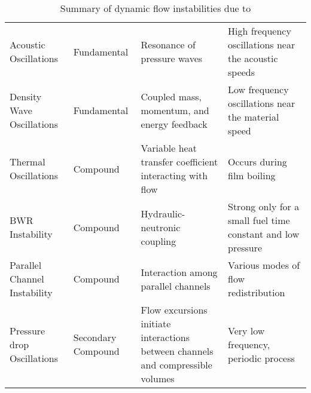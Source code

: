 \begin{table}
    \centering
    \caption[Summary of dynamic flow instabilities]{Summary of dynamic flow instabilities due to \cite{boure_review_1973}}
    \label{Table:DynamicInstabilities}
    \renewcommand{\arraystretch}{1.4}
    {\small
    \begin{tabular}{>{\centering}p{1.1in} >{\centering}p{1.1in} >{\raggedright}p{1.55in} >{\raggedright\arraybackslash}p{1.55in} }
        \toprule
        \multicolumn{1}{c}{\textbf{Name}}      & \multicolumn{1}{c}{\textbf{Class}} & 
        \multicolumn{1}{c}{\textbf{Mechanism}} & \multicolumn{1}{c}{\textbf{Characteristics}}\\\midrule
        Acoustic  Oscillations  & Fundamental & Resonance of pressure waves & 
                High frequency oscillations near the acoustic speeds\\
        Density Wave  Oscillations  & Fundamental & Coupled mass, momentum, and energy feedback & 
                Low frequency oscillations near the material speed\\
        Thermal  Oscillations  & Compound & Variable heat transfer coefficient interacting with flow & 
                Occurs during film boiling \\
        BWR  Instability &  Compound & Hydraulic-neutronic coupling & 
                Strong only for a small fuel time constant and low pressure\\
        Parallel  Channel  Instability & Compound & Interaction among parallel channels & 
                Various modes of flow redistribution\\
        Pressure drop  Oscillations & Secondary Compound& 
                Flow excursions initiate interactions between channels and compressible volumes & 
                        Very low frequency, periodic process\\
    \bottomrule
    \end{tabular}
    }
\end{table}

